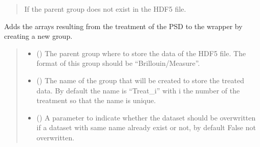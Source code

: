 \documentclass[letterpaper,10pt,english]{sphinxmanual}
\begin{document}
\begin{fulllineitems}
\begin{fulllineitems}
\begin{quote}
\begin{description}
\begin{itemize}
\end{itemize}

\sphinxAtStartPar
{} \textendash{} If the parent group does not exist in the HDF5 file.

\end{description}\end{quote}

\end{fulllineitems}


\begin{fulllineitems}
\label{\detokenize{_autosummary/HDF5_BLS.wrapper:HDF5_BLS.wrapper.Wrapper.add_treated_data}}
\pysigstartsignatures
\pysiglinewithargsret
{}
{\sphinxparamcomma {}\sphinxparamcomma {}\sphinxparamcomma {}}
{}
\pysigstopsignatures
\sphinxAtStartPar
Adds the arrays resulting from the treatment of the PSD to the wrapper by creating a new group.
\begin{quote}\begin{description}
\begin{itemize}
\item {} 
\sphinxAtStartPar
{} (\sphinxstyleliteralemphasis{\sphinxupquote{, }}) \textendash{} The parent group where to store the data of the HDF5 file. The format of this group should be “Brillouin/Measure”.

\item {} 
\sphinxAtStartPar
{} (\sphinxstyleliteralemphasis{\sphinxupquote{, }}) \textendash{} The name of the group that will be created to store the treated data. By default the name is “Treat\_i” with i the number of the treatment so that the name is unique.

\item {} 
\sphinxAtStartPar
{} (\sphinxstyleliteralemphasis{\sphinxupquote{, }}) \textendash{} A parameter to indicate whether the dataset should be overwritten if a dataset with same name already exist or not, by default False \sphinxhyphen{} not overwritten.


\end{itemize}
\end{description}
\end{quote}
\end{fulllineitems}
\end{fulllineitems}
\end{document}
